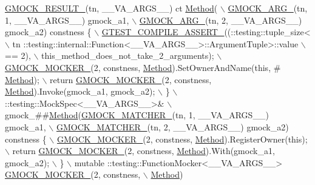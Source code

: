 \begin{DoxyCode}
\hyperlink{gmock-generated-function-mockers_8h_a0e9d94e9c77df84f1103af06feee1077}{GMOCK\_RESULT\_}(tn, \_\_VA\_ARGS\_\_) ct \hyperlink{gmock-spec-builders__test_8cc_a95606368148f3e5aab5db46c32466afd}{Method}( \(\backslash\)
      \hyperlink{gmock-generated-function-mockers_8h_a887575cc1c31158fba808180a10c004f}{GMOCK\_ARG\_}(tn, 1, \_\_VA\_ARGS\_\_) gmock\_a1, \(\backslash\)
      \hyperlink{gmock-generated-function-mockers_8h_a887575cc1c31158fba808180a10c004f}{GMOCK\_ARG\_}(tn, 2, \_\_VA\_ARGS\_\_) gmock\_a2) constness \{ \hyperlink{gtest-port_8h_ae1f37dc71d5daa6fb49ca1b6047d4a8c}{\(\backslash\)}
\hyperlink{gtest-port_8h_ae1f37dc71d5daa6fb49ca1b6047d4a8c}{    GTEST\_COMPILE\_ASSERT\_}((::testing::tuple\_size<                          \(\backslash\)
        tn ::testing::internal::Function<\_\_VA\_ARGS\_\_>::ArgumentTuple>::value \(\backslash\)
            == 2), \(\backslash\)
        this\_method\_does\_not\_take\_2\_arguments); \hyperlink{gmock-generated-function-mockers_8h_a7d362499e27b1bc3a9806dd3cf58a5b7}{\(\backslash\)}
\hyperlink{gmock-generated-function-mockers_8h_a7d362499e27b1bc3a9806dd3cf58a5b7}{    GMOCK\_MOCKER\_}(2, constness, \hyperlink{gmock-spec-builders__test_8cc_a95606368148f3e5aab5db46c32466afd}{Method}).SetOwnerAndName(\textcolor{keyword}{this}, #
      \hyperlink{gmock-spec-builders__test_8cc_a95606368148f3e5aab5db46c32466afd}{Method}); \(\backslash\)
    return \hyperlink{gmock-generated-function-mockers_8h_a7d362499e27b1bc3a9806dd3cf58a5b7}{GMOCK\_MOCKER\_}(2, constness, \hyperlink{gmock-spec-builders__test_8cc_a95606368148f3e5aab5db46c32466afd}{Method}).Invoke(gmock\_a1, gmock\_a2); \(\backslash\)
  \} \(\backslash\)
  ::testing::MockSpec<\_\_VA\_ARGS\_\_>& \(\backslash\)
      gmock\_##\hyperlink{gmock-spec-builders__test_8cc_a95606368148f3e5aab5db46c32466afd}{Method}(\hyperlink{gmock-generated-function-mockers_8h_aa87d0009fe91f1c89d658776b55a769c}{GMOCK\_MATCHER\_}(tn, 1, \_\_VA\_ARGS\_\_) gmock\_a1, \(\backslash\)
                     \hyperlink{gmock-generated-function-mockers_8h_aa87d0009fe91f1c89d658776b55a769c}{GMOCK\_MATCHER\_}(tn, 2, \_\_VA\_ARGS\_\_) gmock\_a2) constness \{ 
      \hyperlink{gmock-generated-function-mockers_8h_a7d362499e27b1bc3a9806dd3cf58a5b7}{\(\backslash\)}
\hyperlink{gmock-generated-function-mockers_8h_a7d362499e27b1bc3a9806dd3cf58a5b7}{    GMOCK\_MOCKER\_}(2, constness, \hyperlink{gmock-spec-builders__test_8cc_a95606368148f3e5aab5db46c32466afd}{Method}).RegisterOwner(\textcolor{keyword}{this}); \(\backslash\)
    return \hyperlink{gmock-generated-function-mockers_8h_a7d362499e27b1bc3a9806dd3cf58a5b7}{GMOCK\_MOCKER\_}(2, constness, \hyperlink{gmock-spec-builders__test_8cc_a95606368148f3e5aab5db46c32466afd}{Method}).With(gmock\_a1, gmock\_a2); \(\backslash\)
  \} \(\backslash\)
  mutable ::testing::FunctionMocker<\_\_VA\_ARGS\_\_> \hyperlink{gmock-generated-function-mockers_8h_a7d362499e27b1bc3a9806dd3cf58a5b7}{GMOCK\_MOCKER\_}(2, constness, \(\backslash\)
      \hyperlink{gmock-spec-builders__test_8cc_a95606368148f3e5aab5db46c32466afd}{Method})
\end{DoxyCode}
